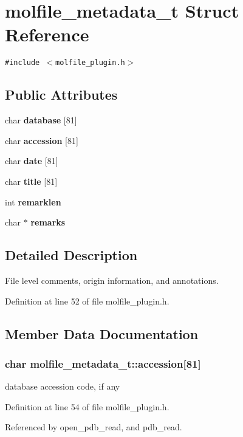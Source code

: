 \section{molfile\_\-metadata\_\-t  Struct Reference}
\label{structmolfile__metadata__t}
{\tt \#include $<$molfile\_\-plugin.h$>$}

\subsection*{Public Attributes}
\begin{CompactItemize}
\item 
char {\bf database} [81]
\item 
char {\bf accession} [81]
\item 
char {\bf date} [81]
\item 
char {\bf title} [81]
\item 
int {\bf remarklen}
\item 
char $\ast$ {\bf remarks}
\end{CompactItemize}


\subsection{Detailed Description}
File level comments, origin information, and annotations. 



Definition at line 52 of file molfile\_\-plugin.h.

\subsection{Member Data Documentation}
\subsubsection{\setlength{\rightskip}{0pt plus 5cm}char molfile\_\-metadata\_\-t::accession[81]}\label{structmolfile__metadata__t_m1}


database accession code, if any 

Definition at line 54 of file molfile\_\-plugin.h.

Referenced by open\_\-pdb\_\-read, and pdb\_\-read.
